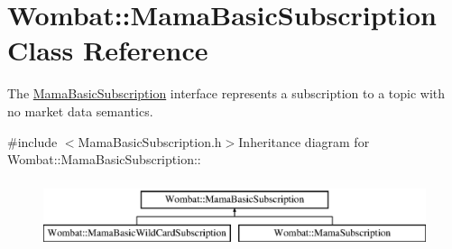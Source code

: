 \hypertarget{classWombat_1_1MamaBasicSubscription}{
\section{Wombat::MamaBasicSubscription Class Reference}
\label{classWombat_1_1MamaBasicSubscription}
}


The {\ttfamily \hyperlink{classWombat_1_1MamaBasicSubscription}{MamaBasicSubscription}} interface represents a subscription to a topic with no market data semantics.  


{\ttfamily \#include $<$MamaBasicSubscription.h$>$}Inheritance diagram for Wombat::MamaBasicSubscription::\begin{figure}[H]
\begin{center}
\leavevmode
\includegraphics[height=2cm]{classWombat_1_1MamaBasicSubscription}
\end{center}
\end{figure}
